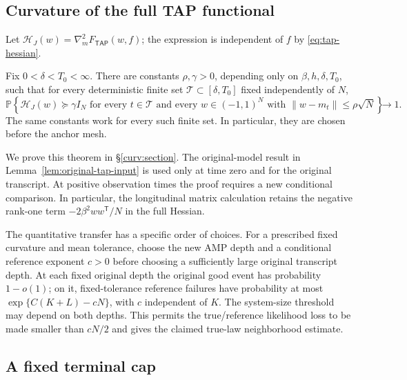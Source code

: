 \documentclass[11pt,reqno]{amsart}
\def\tap{{\mathsf{TAP}}}
\begin{document}
\subsection{Curvature of the full TAP functional}\label{sec:curvature-summary}

Let $\mathcal H_J(w)=\nabla_m^2 F_{\tap}(w,f)$; the expression is independent of $f$ by \eqref{eq:tap-hessian}.

\begin{thm}\label{curv:fixed-anchor}
Fix $0<\delta<T_0<\infty$. There are constants $\rho,\gamma>0$, depending
only on $\beta,h,\delta,T_0$, such that for every deterministic finite set
$\mathcal T\subset[\delta,T_0]$ fixed independently of $N$,
\begin{equation}\label{curv:actual-neighborhood}
 \mathbb P\left\{
   \mathcal H_J(w)\succeq\gamma I_N
   \text{ for every }t\in\mathcal T\text{ and every }
   w\in(-1,1)^N\text{ with }\|w-m_t\|\le\rho\sqrt N
                 \right\}\longrightarrow1.
\end{equation}
The same constants work for every such finite set. In particular, they
are chosen before the anchor mesh.
\end{thm}

We prove this theorem in \S\ref{curv:section}. The original-model result in Lemma~\ref{lem:original-tap-input} is used only at time zero and for the original transcript. At positive observation times the proof requires a new conditional comparison. In particular, the longitudinal matrix calculation retains the negative rank-one term $-2\beta^2ww^{\mathsf T}/N$ in the full Hessian.

The quantitative transfer has a specific order of choices. For a prescribed fixed curvature and mean tolerance, choose the new AMP depth and a conditional reference exponent $c>0$ before choosing a sufficiently large original transcript depth. At each fixed original depth the original good event has probability $1-o(1)$; on it, fixed-tolerance reference failures have probability at most $\exp\{C(K+L)-cN\}$, with $c$ independent of $K$. The system-size threshold may depend on both depths. This permits the true/reference likelihood loss to be made smaller than $cN/2$ and gives the claimed true-law neighborhood estimate.

\subsection{A fixed terminal cap}\label{sec:terminal}
\end{document}
